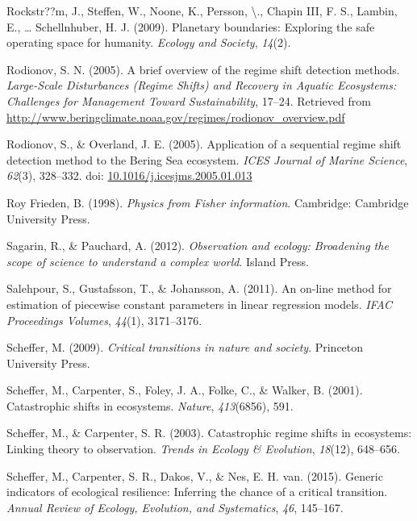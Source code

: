 \documentclass[12pt,twoside,openany]{reedthesis}
\begin{document}
\leavevmode\hypertarget{ref-rockstrom_planetary_2009}{}%
Rockstr??m, J., Steffen, W., Noone, K., Persson, \textbackslash., Chapin III, F. S., Lambin, E., \ldots{} Schellnhuber, H. J. (2009). Planetary boundaries: Exploring the safe operating space for humanity. \emph{Ecology and Society}, \emph{14}(2).

\leavevmode\hypertarget{ref-rodionov_brief_2005}{}%
Rodionov, S. N. (2005). A brief overview of the regime shift detection methods. \emph{Large-Scale Disturbances (Regime Shifts) and Recovery in Aquatic Ecosystems: Challenges for Management Toward Sustainability}, 17--24. Retrieved from \url{http://www.beringclimate.noaa.gov/regimes/rodionov_overview.pdf}

\leavevmode\hypertarget{ref-rodionov_application_2005}{}%
Rodionov, S., \& Overland, J. E. (2005). Application of a sequential regime shift detection method to the Bering Sea ecosystem. \emph{ICES Journal of Marine Science}, \emph{62}(3), 328--332. doi: \href{https://doi.org/10.1016/j.icesjms.2005.01.013}{10.1016/j.icesjms.2005.01.013}

\leavevmode\hypertarget{ref-frieden_physics_1998}{}%
Roy Frieden, B. (1998). \emph{Physics from Fisher information}. Cambridge: Cambridge University Press.

\leavevmode\hypertarget{ref-sagarin_observation_2012}{}%
Sagarin, R., \& Pauchard, A. (2012). \emph{Observation and ecology: Broadening the scope of science to understand a complex world}. Island Press.

\leavevmode\hypertarget{ref-salehpour2011line}{}%
Salehpour, S., Gustafsson, T., \& Johansson, A. (2011). An on-line method for estimation of piecewise constant parameters in linear regression models. \emph{IFAC Proceedings Volumes}, \emph{44}(1), 3171--3176.

\leavevmode\hypertarget{ref-scheffer_critical_2009}{}%
Scheffer, M. (2009). \emph{Critical transitions in nature and society}. Princeton University Press.

\leavevmode\hypertarget{ref-scheffer_catastrophic_2001}{}%
Scheffer, M., Carpenter, S., Foley, J. A., Folke, C., \& Walker, B. (2001). Catastrophic shifts in ecosystems. \emph{Nature}, \emph{413}(6856), 591.

\leavevmode\hypertarget{ref-scheffer2003catastrophic}{}%
Scheffer, M., \& Carpenter, S. R. (2003). Catastrophic regime shifts in ecosystems: Linking theory to observation. \emph{Trends in Ecology \& Evolution}, \emph{18}(12), 648--656.

\leavevmode\hypertarget{ref-scheffer2015generic}{}%
Scheffer, M., Carpenter, S. R., Dakos, V., \& Nes, E. H. van. (2015). Generic indicators of ecological resilience: Inferring the chance of a critical transition. \emph{Annual Review of Ecology, Evolution, and Systematics}, \emph{46}, 145--167.
\end{document}
